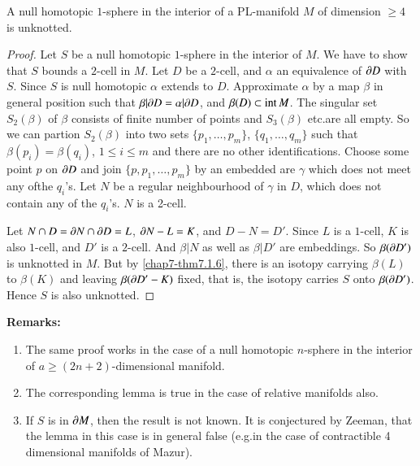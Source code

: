 \setcounter{proposition}{1}
\begin{lemma}\label{chap8-lem8.7.2}
A null homotopic $1$-sphere in the interior of a PL-man\-ifold $M$ of dimension $\geq 4$ is unknotted.
\end{lemma}

\begin{proof}
Let $S$ be a null homotopic $1$-sphere in the interior of $M$. We have to show that $S$ bounds a $2$-cell in $M$. Let $D$ be a $2$-cell, and $\alpha$ an equivalence of $\partial D$ with $S$. Since $S$ is null homotopic $\alpha$ extends to $D$. Approximate $\alpha$ by a map $\beta$ in general position such that $\beta |\partial D=\alpha|\partial D$, and $\beta(D)\subset \text{int\,}M$. The singular set $S_{2}(\beta)$ of $\beta$ consists of finite number of points and $S_{3}(\beta)$ etc.\@ are all empty. So we can partion $S_{2}(\beta)$ into two sets $\{p_{1},\ldots,p_{m}\}$, $\{q_{1},\ldots,q_{m}\}$ such that $\beta (p_{i})=\beta(q_{i})$, $1\leq i\leq m$ and there are no other identifications. Choose some point $p$ on $\partial D$ and join $\{p,p_{1},\ldots,p_{m}\}$ by an embedded are $\gamma$ which does not meet any of\pageoriginale the $q_{i}$'s. Let $N$ be a regular neighbourhood of $\gamma$ in
$D$, which does not contain any of the $q_{i}$'s. $N$ is a 2-cell.

Let $N\cap D=\partial N\cap \partial D=L$, $\partial N-L=K$, and $D-N=D'$. Since $L$ is a $1$-cell, $K$ is also $1$-cell, and $D'$ is a $2$-cell. And $\beta|N$ as well as $\beta|D'$ are embeddings. So $\beta(\partial D')$ is unknotted in $M$. But by \ref{chap7-thm7.1.6}, there is an isotopy carrying $\beta(L)$ to $\beta(K)$ and leaving $\beta(\partial D'-K)$ fixed, that is, the isotopy carries $S$ onto $\beta(\partial D')$. Hence $S$ is also unknotted.
\end{proof}

\noindent
{\bf Remarks:}
\begin{enumerate}
\renewcommand{\labelenumi}{(\theenumi)}
\item The same proof works in the case of a null homotopic $n$-sphere in the interior of $a\geq (2n+2)$-dimensional manifold.

\item The corresponding lemma is true in the case of relative manifolds also.

\item If $S$ is in $\partial M$, then the result is not known. It is conjectured by Zeeman, that the lemma in this case is in general false (e.g.\@ in the case of contractible 4 dimensional manifolds of Mazur).
\end{enumerate}

